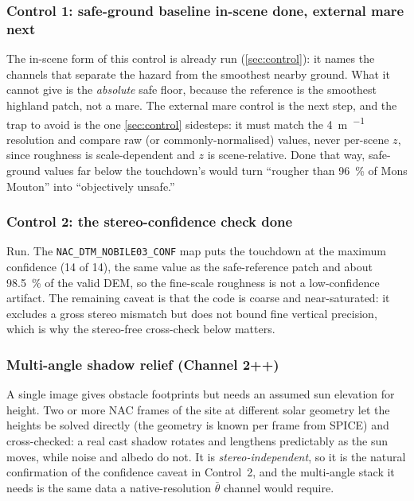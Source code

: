 \documentclass[11pt]{article}
\begin{document}
\subsubsection{Control 1: safe-ground baseline \textemdash{} in-scene done, external mare next}
The in-scene form of this control is already run (\cref{sec:control}): it names the
channels that separate the hazard from the smoothest nearby ground. What it cannot give
is the \emph{absolute} safe floor, because the reference is the smoothest highland
patch, not a mare. The external mare control is the next step, and the trap to avoid is
the one \cref{sec:control} sidesteps: it must match the \SI{4}{\meter\per\px} resolution
and compare raw (or commonly-normalised) values, never per-scene $z$, since roughness is
scale-dependent \autocite{caifa2020} and $z$ is scene-relative. Done that way,
safe-ground values far below the touchdown's would turn ``rougher than
\SI{96}{\percent} of Mons Mouton'' into ``objectively unsafe.''

\subsubsection{Control 2: the stereo-confidence check \textemdash{} done}
Run. The \texttt{NAC\_DTM\_NOBILE03\_CONF} map \autocite{henriksen2017} puts the
touchdown at the maximum confidence (14 of 14), the same value as the safe-reference
patch and about \SI{98.5}{\percent} of the valid DEM, so the fine-scale roughness is
not a low-confidence artifact. The remaining caveat is that the code is coarse and
near-saturated: it excludes a gross stereo mismatch but does not bound fine vertical
precision, which is why the stereo-free cross-check below matters.

\subsubsection{Multi-angle shadow relief (Channel 2++)}
A single image gives obstacle footprints but needs an assumed sun elevation for height.
Two or more NAC frames of the site at different solar geometry let the heights be solved
directly (the geometry is known per frame from SPICE) and cross-checked: a real cast
shadow rotates and lengthens predictably as the sun moves, while noise and albedo do
not. It is \emph{stereo-independent}, so it is the natural confirmation of the
confidence caveat in Control~2, and the multi-angle stack it needs is the same data a
native-resolution $\bar\theta$ channel would require.
\end{document}
